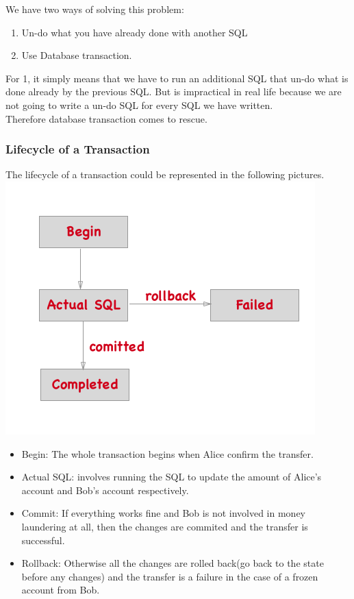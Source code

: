\documentclass[a4paper]{article}
\begin{document}
We have two ways of solving this problem:\\

\begin{enumerate}
\item Un-do what you have already done with another SQL
\item Use Database transaction.
\end{enumerate}
For 1, it simply means that we have to run an additional SQL that un-do what is done already by the previous SQL. But is impractical in real life because we are not going to write a un-do SQL for every SQL we have written.\\

Therefore database transaction comes to rescue.

\subsubsection{Lifecycle of a Transaction}
The lifecycle of a transaction could be represented in the following pictures.
\includegraphics{img/transaction_states.png}
\begin{itemize}
\item Begin: The whole transaction begins when Alice confirm the transfer.
\item Actual SQL: involves running the SQL to update the amount of Alice’s account and Bob’s account respectively.
\item Commit: If everything works fine and Bob is not involved in money laundering at all, then the changes are commited and the transfer is successful.
\item Rollback: Otherwise all the changes are rolled back(go back to the state before any changes) and the transfer is a failure in the case of a frozen account from Bob.
\end{itemize}
\end{document}
